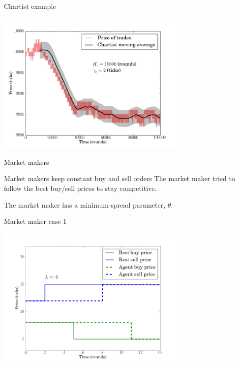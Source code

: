 \documentclass[14pt]{beamer}
\begin{document}

\begin{frame}{Chartist example}
\begin{center}
\includegraphics[width=0.7\textwidth]{chartist/h.png}
\end{center}
\end{frame}



\begin{frame}{Market makers}
\begin{block}{Market makers keep constant buy and sell orders}
The market maker tried to follow the best buy/sell prices to stay competitive.
\end{block}
The market maker has a minimum-spread parameter, $\theta$.
\end{frame}

\begin{frame}{Market maker case 1}
\begin{center}
\includegraphics[width=0.7\textwidth]{marketmaker/a.png}
\end{center}
\end{frame}
\end{document}
